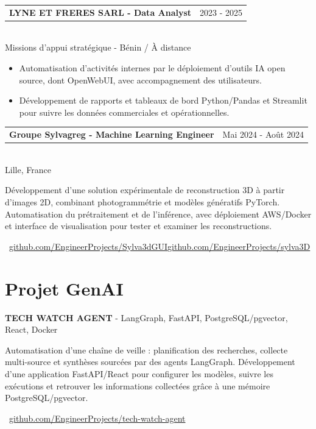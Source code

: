 \documentclass[10pt,a4paper]{article}
\makeatletter
\newcommand{\role}[3]{%
  \vspace{3pt}
  \begin{tabularx}{\linewidth}{@{}Xr@{}}
  \textbf{#1} & {\color{muted}#2}
  \end{tabularx}\vspace{0.8pt}\\
  {\color{muted}#3}\par
  \vspace{3pt}
}
\newcommand{\projectline}[2]{%
  \textbf{#1} - #2\par
}
\newcommand{\githublink}[2]{%
  \par{\footnotesize\color{accent}\faIcon{github}\ \href{#1}{#2}}\par
}
\newlength{\maincolumnheight}
\makeatother
\begin{document}
\begin{lrbox}{\maincolumnbox}
\begin{minipage}[t]{0.695\textwidth}
\vspace{8pt}
\role{LYNE ET FRERES SARL - Data Analyst}{2023 - 2025}{Missions d'appui stratégique - Bénin / À distance}
\begin{itemize}
  \item Automatisation d'activités internes par le déploiement d'outils IA open source, dont OpenWebUI, avec accompagnement des utilisateurs.
  \item Développement de rapports et tableaux de bord Python/Pandas et Streamlit pour suivre les données commerciales et opérationnelles.
\end{itemize}

\vspace{6pt}
\role{Groupe Sylvagreg - Machine Learning Engineer}{Mai 2024 - Août 2024}{Lille, France}
Développement d'une solution expérimentale de reconstruction 3D à partir d'images 2D, combinant photogrammétrie et modèles génératifs PyTorch. Automatisation du prétraitement et de l'inférence, avec déploiement AWS/Docker et interface de visualisation pour tester et examiner les reconstructions.\par
{\fontsize{7.5pt}{9pt}\selectfont\color{accent}\ \href{https://github.com/EngineerProjects/Sylva3dGUI}{github.com/EngineerProjects/Sylva3dGUI}\enspace\textbullet\enspace\href{https://github.com/EngineerProjects/sylva3D}{github.com/EngineerProjects/sylva3D}}\par

\section{Projet GenAI}
\projectline{TECH WATCH AGENT}{LangGraph, FastAPI, PostgreSQL/pgvector, React, Docker}
Automatisation d'une chaîne de veille : planification des recherches, collecte multi-source et synthèses sourcées par des agents LangGraph. Développement d'une application FastAPI/React pour configurer les modèles, suivre les exécutions et retrouver les informations collectées grâce à une mémoire PostgreSQL/pgvector.
\githublink{https://github.com/EngineerProjects/tech-watch-agent}{github.com/EngineerProjects/tech-watch-agent}

\end{minipage}
\end{lrbox}
\setlength{\maincolumnheight}{\dimexpr\ht\maincolumnbox+\dp\maincolumnbox\relax}
\end{document}
